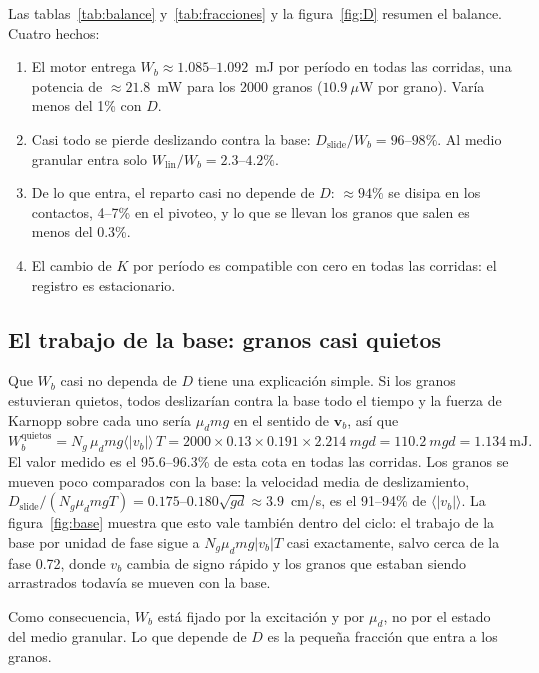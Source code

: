 \documentclass[11pt,a4paper]{article}
\newcommand{\vect}[1]{\mathbf{#1}}
\newcommand{\vv}{\vect{v}}
\newcommand{\ave}[1]{\langle #1 \rangle}
\newcommand{\Wb}{W_b}
\newcommand{\Wlin}{W_\text{lin}}
\newcommand{\Dslide}{D_\text{slide}}
\begin{document}
Las tablas~\ref{tab:balance} y~\ref{tab:fracciones} y la
figura~\ref{fig:D} resumen el balance. Cuatro hechos:
\begin{enumerate}
  \item El motor entrega $\Wb \approx 1.085$--$1.092$~mJ por período en
    todas las corridas, una potencia de $\approx 21.8$~mW para los 2000
    granos ($10.9~\mu$W por grano). Varía menos del 1\% con $D$.
  \item Casi todo se pierde deslizando contra la base: $\Dslide/\Wb =
    96$--$98\%$. Al medio granular entra solo $\Wlin/\Wb = 2.3$--$4.2\%$.
  \item De lo que entra, el reparto casi no depende de $D$: $\approx
    94\%$ se disipa en los contactos, 4--7\% en el pivoteo, y lo que se
    llevan los granos que salen es menos del 0.3\%.
  \item El cambio de $K$ por período es compatible con cero en todas las
    corridas: el registro es estacionario.
\end{enumerate}

\subsection{El trabajo de la base: granos casi quietos}
\label{sec:quietos}

Que $\Wb$ casi no dependa de $D$ tiene una explicación simple. Si los
granos estuvieran quietos, todos deslizarían contra la base todo el tiempo
y la fuerza de Karnopp sobre cada uno sería $\mu_d m g$ en el sentido de
$\vv_b$, así que
\begin{equation}
  \Wb^\text{quietos} = N_g\, \mu_d m g \ave{|v_b|}\, T
  = 2000 \times 0.13 \times 0.191 \times 2.214\ mgd = 110.2\ mgd =
  1.134\ \text{mJ} .
  \label{eq:quietos}
\end{equation}
El valor medido es el 95.6--96.3\% de esta cota en todas las corridas.
Los granos se mueven poco comparados con la base: la velocidad media de
deslizamiento, $\Dslide/(N_g \mu_d m g T) = 0.175$--$0.180\sqrt{gd}
\approx 3.9$~cm/s, es el 91--94\% de $\ave{|v_b|}$. La
figura~\ref{fig:base} muestra que esto vale también dentro del ciclo: el
trabajo de la base por unidad de fase sigue a $N_g \mu_d m g |v_b| T$
casi exactamente, salvo cerca de la fase 0.72, donde $v_b$ cambia de signo
rápido y los granos que estaban siendo arrastrados todavía se mueven con la
base.

Como consecuencia, $\Wb$ está fijado por la excitación y por $\mu_d$, no
por el estado del medio granular. Lo que depende de $D$ es la pequeña
fracción que entra a los granos.
\end{document}
